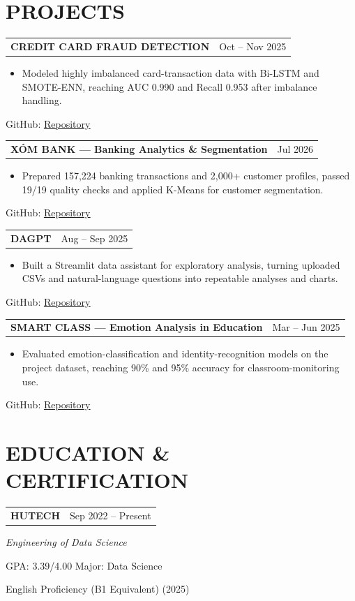 \documentclass[10pt,letterpaper]{article}
\makeatletter
\newcommand{\cvsection}[2]{\section*{\faIcon{#1}\hspace{0.45em}#2}}
\newcommand{\cvlink}[2]{\href{#1}{\underline{#2}}}
\newcommand{\projectentry}[4]{%
  \begin{tabularx}{\textwidth}{@{}X>{\raggedleft\arraybackslash}p{1.52in}@{}}
    \textbf{#1} & \normalsize #2 \\
  \end{tabularx}\par
  \begin{itemize}[leftmargin=1.75em,itemsep=0em,topsep=0.08em,parsep=0em,partopsep=0em]
    \item \small #3
  \end{itemize}
  \small\hspace{1.15em}GitHub: \cvlink{#4}{Repository}\par
}
\makeatother
\begin{document}
\cvsection{briefcase}{PROJECTS}
\projectentry{CREDIT CARD FRAUD DETECTION}{Oct -- Nov 2025}{Modeled highly imbalanced card-transaction data with Bi-LSTM and SMOTE-ENN, reaching AUC 0.990 and Recall 0.953 after imbalance handling.}{https://github.com/lehoanggiavi/ccfd}
\vspace{0.16em}
\projectentry{XÓM BANK --- Banking Analytics \& Segmentation}{Jul 2026}{Prepared 157,224 banking transactions and 2,000+ customer profiles, passed 19/19 quality checks and applied K-Means for customer segmentation.}{https://github.com/lehoanggiavi/Banking}
\vspace{0.16em}
\projectentry{DAGPT}{Aug -- Sep 2025}{Built a Streamlit data assistant for exploratory analysis, turning uploaded CSVs and natural-language questions into repeatable analyses and charts.}{https://github.com/lehoanggiavi/dagpt}
\vspace{0.16em}
\projectentry{SMART CLASS --- Emotion Analysis in Education}{Mar -- Jun 2025}{Evaluated emotion-classification and identity-recognition models on the project dataset, reaching 90\% and 95\% accuracy for classroom-monitoring use.}{https://github.com/lehoanggiavi/smart_class}

\cvsection{graduation-cap}{EDUCATION \& CERTIFICATION}
\begin{tabularx}{\textwidth}{@{}X>{\raggedleft\arraybackslash}p{1.52in}@{}}
  \textbf{HUTECH} & \normalsize Sep 2022 -- Present \\
\end{tabularx}\par
\small\textit{Engineering of Data Science}\par
\small GPA: 3.39/4.00 \quad\textbullet\quad Major: Data Science\par
\small English Proficiency (B1 Equivalent) (2025)
\end{document}
